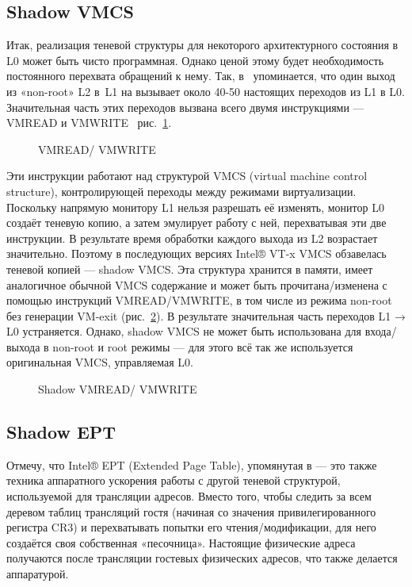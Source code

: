\subsection{Shadow VMCS}
Итак, реализация теневой структуры для некоторого архитектурного состояния в L0 может быть чисто программная. Однако ценой этому будет необходимость постоянного перехвата обращений к нему. Так, в  упоминается, что один выход из «non-root» L2 в L1 на вызывает около 40-50 настоящих переходов из L1 в L0. Значительная часть этих переходов вызвана всего двумя инструкциями — VMREAD и VMWRITE  рис. \ref{fig:nested-vmread}.

\begin{figure}[htb]
    \centering
    \caption[]{VMREAD/ VMWRITE \todo}
    \label{fig:nested-vmread}
\end{figure}

Эти инструкции работают над структурой VMCS (\abbr virtual machine control structure), контролирующей переходы между режимами виртуализации. Поскольку напрямую монитору L1 нельзя разрешать её изменять, монитор L0 создаёт теневую копию, а затем эмулирует работу с ней, перехватывая эти две инструкции. В результате время обработки каждого выхода из L2 возрастает значительно.
Поэтому в последующих версиях Intel® VT-x VMCS обзавелась теневой копией — shadow VMCS. Эта структура хранится в памяти, имеет аналогичное обычной VMCS содержание и может быть прочитана/изменена с помощью инструкций VMREAD/VMWRITE, в том числе из режима non-root без генерации VM-exit (рис. \ref{fig:nested-vmread-shadow}).
В результате значительная часть переходов L1 → L0 устраняется. Однако, shadow VMCS не может быть использована для входа/выхода в non-root и root режимы — для этого всё так же используется оригинальная VMCS, управляемая L0.


\begin{figure}[htb]
    \centering
    \caption[]{Shadow VMREAD/ VMWRITE \todo}
    \label{fig:nested-vmread-shadow}
\end{figure}


\subsection{Shadow EPT}

Отмечу, что Intel® EPT (\abbr Extended Page Table), упомянутая в — это также техника аппаратного ускорения работы с другой теневой структурой, используемой для трансляции адресов. Вместо того, чтобы следить за всем деревом таблиц трансляций гостя (начиная со значения привилегированного регистра CR3) и перехватывать попытки его чтения/модификации, для него создаётся своя собственная «песочница». Настоящие физические адреса получаются после трансляции гостевых физических адресов, что также делается аппаратурой.

